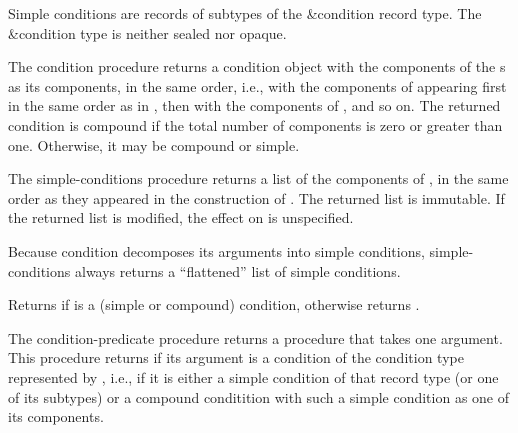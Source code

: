 \begin{entry}{%
}

Simple conditions are records of subtypes of the {\cf\&condition}
record type.  The {\cf\&condition} type is neither sealed nor opaque.
\end{entry}

\begin{entry}{%
}

  The {\cf condition}
procedure returns a condition object with the components of the
s as its components, in the same order, i.e., with the
components of  appearing first in the same order as in
, then with the components of , and so on.  The
returned condition is compound if the total number of components is
zero or greater than one.  Otherwise, it may be compound or simple.
\end{entry}

\begin{entry}{%
}

  The {\cf simple-conditions}
procedure returns a list of the components of , in the same
order as they appeared in the construction of .  The
returned list is immutable.  If the returned list is modified, the
effect on  is unspecified.

\begin{note}
  Because {\cf condition} decomposes its arguments into simple
  conditions, {\cf simple-conditions} always returns a ``flattened''
  list of simple conditions.
\end{note}
\end{entry}


\begin{entry}{%
}

Returns \schtrue{} if  is a (simple or compound) condition,
otherwise returns \schfalse.
\end{entry}

\begin{entry}{%
}

  The {\cf condition-predicate} procedure returns
a procedure that takes one argument.  This procedure returns
\schtrue{} if its argument is a condition of the condition type
represented by , i.e., if it is either a simple condition of
that record type (or one of its subtypes) or a compound conditition
with such a simple condition as one of its components.
\end{entry}

